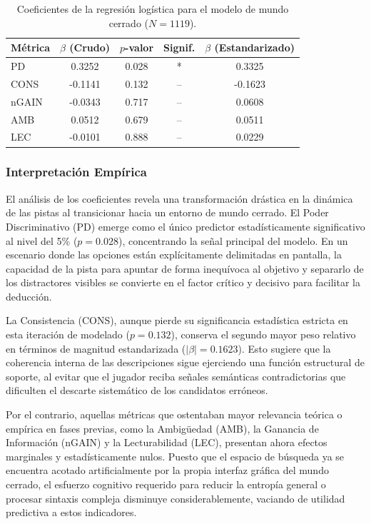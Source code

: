 \begin{table}[H]
\centering
\begin{tabular}{lcccc}
\hline
Métrica & $\beta$ (Crudo) & $p$-valor & Signif. & $\beta$ (Estandarizado) \\
\hline
PD & 0.3252 & 0.028 & * & 0.3325 \\
CONS & -0.1141 & 0.132 & -- & -0.1623 \\
nGAIN & -0.0343 & 0.717 & -- & 0.0608 \\
AMB & 0.0512 & 0.679 & -- & 0.0511 \\
LEC & -0.0101 & 0.888 & -- & 0.0229 \\
\hline
\end{tabular}
\caption{Coeficientes de la regresión logística para el modelo de mundo cerrado ($N=1119$).}
\label{tab:coef_mundo_cerrado}
\end{table}

\subsubsection{Interpretación Empírica}

El análisis de los coeficientes revela una transformación drástica en la dinámica de las pistas al transicionar hacia un entorno de mundo cerrado. El Poder Discriminativo (PD) emerge como el único predictor estadísticamente significativo al nivel del 5\% ($p = 0.028$), concentrando la señal principal del modelo. En un escenario donde las opciones están explícitamente delimitadas en pantalla, la capacidad de la pista para apuntar de forma inequívoca al objetivo y separarlo de los distractores visibles se convierte en el factor crítico y decisivo para facilitar la deducción.

La Consistencia (CONS), aunque pierde su significancia estadística estricta en esta iteración de modelado ($p = 0.132$), conserva el segundo mayor peso relativo en términos de magnitud estandarizada ($|\beta| = 0.1623$). Esto sugiere que la coherencia interna de las descripciones sigue ejerciendo una función estructural de soporte, al evitar que el jugador reciba señales semánticas contradictorias que dificulten el descarte sistemático de los candidatos erróneos.

Por el contrario, aquellas métricas que ostentaban mayor relevancia teórica o empírica en fases previas, como la Ambigüedad (AMB), la Ganancia de Información (nGAIN) y la Lecturabilidad (LEC), presentan ahora efectos marginales y estadísticamente nulos. Puesto que el espacio de búsqueda ya se encuentra acotado artificialmente por la propia interfaz gráfica del mundo cerrado, el esfuerzo cognitivo requerido para reducir la entropía general o procesar sintaxis compleja disminuye considerablemente, vaciando de utilidad predictiva a estos indicadores.

